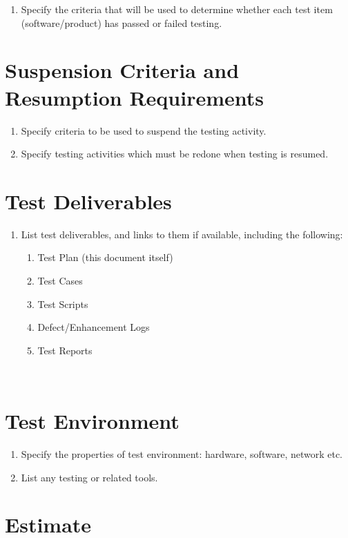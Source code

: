 \begin{enumerate}
	\item Specify the criteria that will be used to determine whether each test item (software/product) has passed or failed testing.
\end{enumerate}

\section{Suspension Criteria and Resumption Requirements}

\begin{enumerate}
	\item Specify criteria to be used to suspend the testing activity.
	\item Specify testing activities which must be redone when testing is resumed.
\end{enumerate}

\section{Test Deliverables}

\begin{enumerate}
	\item List test deliverables, and links to them if available, including the following:

\begin{enumerate}
	\item Test Plan (this document itself)
	\item Test Cases
	\item Test Scripts
	\item Defect/Enhancement Logs
	\item Test Reports
\end{enumerate}
\end{enumerate}
~
\section{Test Environment}

\begin{enumerate}
	\item Specify the properties of test environment: hardware, software, network etc.
	\item List any testing or related tools.
\end{enumerate}

\section{Estimate}

